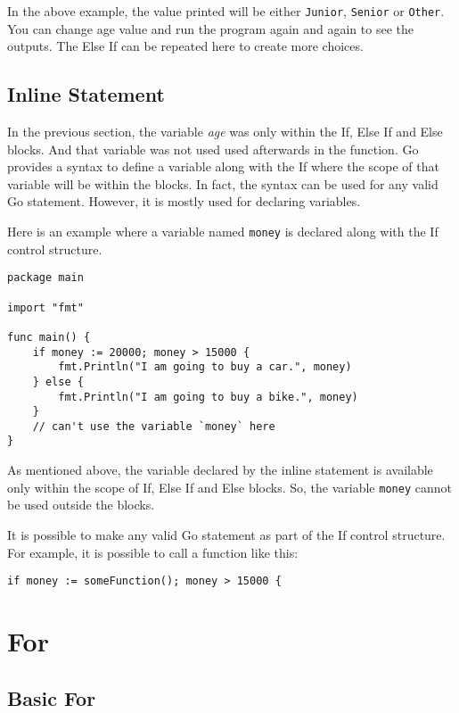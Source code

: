 In the above example, the value printed will be
either \texttt{Junior}, \texttt{Senior} or \texttt{Other}.  You can
change age value and run the program again and again to see the
outputs.  The Else If can be repeated here to create more choices.

\subsection{Inline Statement}

In the previous section, the variable \textit{age} was only within the
If, Else If and Else blocks.  And that variable was not used used
afterwards in the function.  Go provides a syntax to define a variable
along with the If where the scope of that variable will be within the
blocks.  In fact, the syntax can be used for any valid Go statement.
However, it is mostly used for declaring variables.

Here is an example where a variable named \texttt{money} is declared
along with the If control structure.

\begin{lstlisting}[caption=If with initialization statement]
package main

import "fmt"

func main() {
    if money := 20000; money > 15000 {
        fmt.Println("I am going to buy a car.", money)
    } else {
        fmt.Println("I am going to buy a bike.", money)
    }
    // can't use the variable `money` here
}
\end{lstlisting}

As mentioned above, the variable declared by the inline statement is
available only within the scope of If, Else If and Else blocks.  So,
the variable \texttt{money} cannot be used outside the blocks.

It is possible to make any valid Go statement as part of the If
control structure.  For example, it is possible to call a function
like this:

\begin{lstlisting}[caption=Variable initialization in If]
    if money := someFunction(); money > 15000 {
\end{lstlisting}

\section{For}

\subsection{Basic For}

